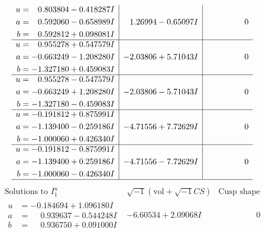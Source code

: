 \documentclass[1p]{elsarticle_modified}
\theoremstyle{definition}
\newcommand{\I}{\sqrt{-1}}
\begin{document}
$$\begin{array}{c|c|c}
\begin{aligned}
u &= \phantom{-}0.803804 - 0.418287 I \\
a &= \phantom{-}0.592060 - 0.658989 I \\
b &= \phantom{-}0.592812 + 0.098081 I\end{aligned}
 & \phantom{-}1.26994 - 0.65097 I & \phantom{-0.000000 } 0 \\ \hline\begin{aligned}
u &= \phantom{-}0.955278 + 0.547579 I \\
a &= -0.663249 - 1.208280 I \\
b &= -1.327180 + 0.459083 I\end{aligned}
 & -2.03806 + 5.71043 I & \phantom{-0.000000 } 0 \\ \hline\begin{aligned}
u &= \phantom{-}0.955278 - 0.547579 I \\
a &= -0.663249 + 1.208280 I \\
b &= -1.327180 - 0.459083 I\end{aligned}
 & -2.03806 - 5.71043 I & \phantom{-0.000000 } 0 \\ \hline\begin{aligned}
u &= -0.191812 + 0.875991 I \\
a &= -1.139400 - 0.259186 I \\
b &= -1.000060 + 0.426340 I\end{aligned}
 & -4.71556 + 7.72629 I & \phantom{-0.000000 } 0 \\ \hline\begin{aligned}
u &= -0.191812 - 0.875991 I \\
a &= -1.139400 + 0.259186 I \\
b &= -1.000060 - 0.426340 I\end{aligned}
 & -4.71556 - 7.72629 I & \phantom{-0.000000 } 0\\
 \hline 
 \end{array}$$\newpage$$\begin{array}{c|c|c}  
\text{Solutions to }I^u_{1}& \I (\text{vol} + \sqrt{-1}CS) & \text{Cusp shape}\\
 \hline 
\begin{aligned}
u &= -0.184694 + 1.096180 I \\
a &= \phantom{-}0.939637 - 0.544248 I \\
b &= \phantom{-}0.936750 + 0.091000 I\end{aligned}
 & -6.60534 + 2.09068 I & \phantom{-0.000000 } 0 \\ \hline\begin{aligned}

\end{aligned}
\end{array}$$
\end{document}
